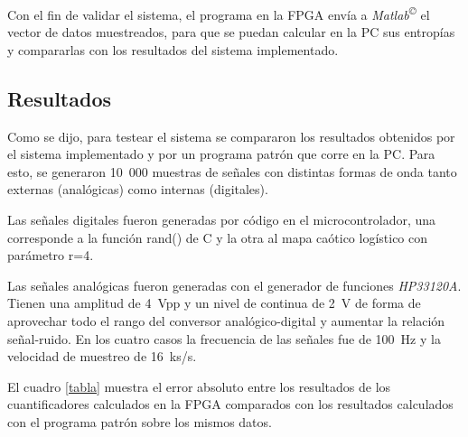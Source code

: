 Con el fin de validar el sistema, el programa en la FPGA envía a \textit{Matlab\textsuperscript\copyright} el vector de datos muestreados, para que se puedan calcular en la PC sus entropías y compararlas con los resultados del sistema implementado.

\subsection{Resultados}
\label{sec:resultados}

Como se dijo, para testear el sistema se compararon los resultados obtenidos por el sistema implementado y por un programa patrón que corre en la PC.
Para esto, se generaron 10~000 muestras de señales con distintas formas de onda tanto externas (analógicas) como internas (digitales).

Las señales digitales fueron generadas por código en el microcontrolador, una corresponde a la función rand() de C y la otra al mapa caótico logístico con parámetro r=4.

Las señales analógicas fueron generadas con el generador de funciones \textit{HP33120A}.
Tienen una amplitud de 4~Vpp y un nivel de continua de 2~V de forma de aprovechar todo el rango del conversor analógico-digital y aumentar la relación señal-ruido.
En los cuatro casos la frecuencia de las señales fue de 100~Hz y la velocidad de muestreo de 16~ks/s.

El cuadro \ref{tabla} muestra el error absoluto entre los resultados de los cuantificadores calculados en la FPGA comparados con los resultados calculados con el programa patrón sobre los mismos datos.

